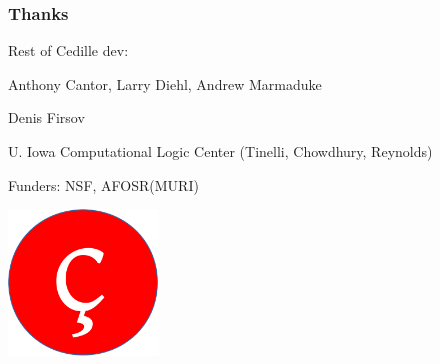 \documentclass[11pt]{beamer}
\begin{document}




\begin{frame}
  \frametitle{Thanks}


  Rest of Cedille dev:
  
  \hspace{1cm} Anthony Cantor, Larry Diehl, Andrew Marmaduke

\vspace{1cm}

  Denis Firsov

\vspace{1cm}

  U. Iowa Computational Logic Center (Tinelli, Chowdhury, Reynolds)

\vspace{1cm}

  Funders: NSF, AFOSR(MURI)

\end{frame}


\begin{frame}
\begin{center}

\vspace{1cm}

\includegraphics[width=4cm]{logo}
\end{center}
\end{frame}
\end{document}
